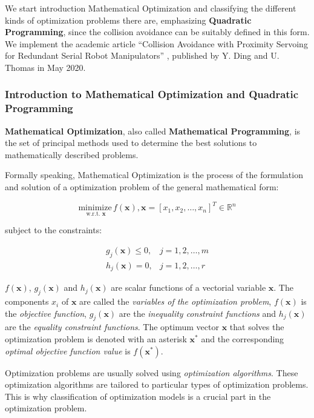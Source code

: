 We start introduction Mathematical Optimization and classifying the different kinds of optimization problems there are, emphasizing \textbf{Quadratic Programming}, since the collision avoidance can be suitably defined in this form. We implement the academic article ``Collision Avoidance with Proximity Servoing for Redundant Serial Robot Manipulators'' \cite{dingcollision}, published by Y. Ding and U. Thomas in May 2020.

\subsubsection{Introduction to Mathematical Optimization and Quadratic Programming}
\label{sss:optimizationintro}

\textbf{Mathematical Optimization}, also called \textbf{Mathematical Programming}, is the set of principal methods used to determine the best solutions to mathematically described problems.

Formally speaking, Mathematical Optimization is the process of the formulation and solution of a optimization problem of the general mathematical form:

$$
\underset{\text { w.r.t. } \mathbf{x}}{\text{minimize}} \, f(\mathbf{x}), \mathbf{x}=\left[x_{1}, x_{2}, \ldots, x_{n}\right]^{T} \in \mathbb{R}^{n}
$$

subject  to  the  constraints:

$$
\begin{array}{ll}
    g_{j}(\mathbf{x}) \leq 0, & j=1,2, \ldots, m \\
    h_{j}(\mathbf{x})=0, & j=1,2, \ldots, r
\end{array}
$$

$f(\mathbf{x})$, $g_{j}(\mathbf{x})$ and $h_{j}(\mathbf{x})$ are scalar functions of a vectorial variable $\mathbf{x}$. The components $x_i$ of $\mathbf{x}$ are called the \textit{variables of the optimization problem}, $f(\mathbf{x})$ is the \textit{objective function}, $g_{j}(\mathbf{x})$ are the \textit{inequality constraint functions} and $h_{j}(\mathbf{x})$ are the \textit{equality constraint functions}. The optimum vector $\mathbf{x}$ that solves the optimization problem is denoted with an asterisk $\mathbf{x^{*}}$ and the corresponding \textit{optimal objective function value }is $f(\mathbf{x^{*}})$.

Optimization problems are usually solved using \textit{optimization algorithms}. These optimization algorithms are tailored to particular types of optimization problems. This is why classification of optimization models is a crucial part in the optimization problem.

